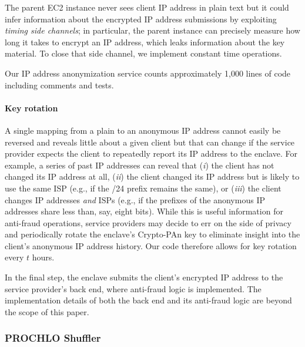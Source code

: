 
The parent EC2 instance never sees client IP address in plain text but it could infer information about the encrypted IP address submissions by exploiting \emph{timing side channels}; in particular, the parent instance can precisely measure how long it takes to encrypt an IP address, which leaks information about the key material.  To close that side channel, we implement constant time operations.

Our IP address anonymization service counts approximately 1,000 lines of code including comments and tests.


\paragraph{Key rotation}

\cite{Padmanabhan20a}


A single mapping from a plain to an anonymous IP address cannot easily be reversed and reveals little about a given client but that can change if the service provider expects the client to repeatedly report its IP address to the enclave.  For example, a series of past IP addresses can reveal that (\emph{i}) the client has not changed its IP address at all, (\emph{ii}) the client changed its IP address but is likely to use the same ISP (e.g., if the /24 prefix remains the same), or (\emph{iii}) the client changes IP addresses \emph{and} ISPs (e.g., if the prefixes of the anonymous IP addresses share less than, say, eight bits).  While this is useful information for anti-fraud operations, service providers may decide to err on the side of privacy and periodically rotate the enclave's Crypto-PAn key to eliminate insight into the client's anonymous IP address history.  Our code therefore allows for key rotation every $t$ hours.

In the final step, the enclave submits the client's encrypted IP address to the service provider's back end, where anti-fraud logic is implemented.  The implementation details of both the back end and its anti-fraud logic are beyond the scope of this paper.

\subsubsection{PROCHLO Shuffler}
\label{sec:shuffler}

